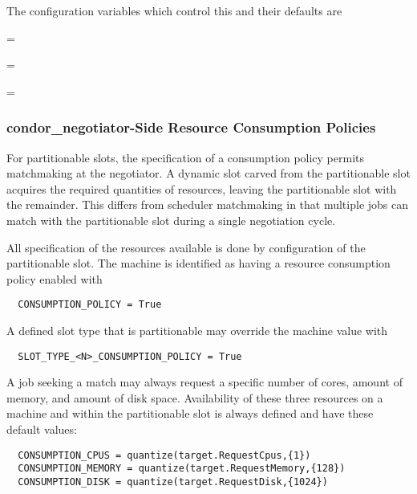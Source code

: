 The  configuration variables which control this 
and their defaults are

\begin{description}
  \item{ = }
  \item{ = }
  \item{ = }
\end{description}

\subsubsection{\label{sec:consumption-policy}
condor\_negotiator-Side Resource Consumption Policies}
For partitionable slots, 
the specification of a consumption policy permits matchmaking
at the negotiator.
A dynamic slot carved from the partitionable slot acquires the
required quantities of resources, leaving the partitionable
slot with the remainder. 
This differs from scheduler matchmaking in that multiple
jobs can match with the partitionable slot during a single
negotiation cycle.

All specification of the resources available is done by configuration 
of the partitionable slot.  The machine is identified
as having a resource consumption policy enabled with
\begin{verbatim}
  CONSUMPTION_POLICY = True
\end{verbatim}
A defined slot type that is partitionable may override the
machine value with
\begin{verbatim}
  SLOT_TYPE_<N>_CONSUMPTION_POLICY = True
\end{verbatim}

A job seeking a match may always request a specific number of cores,
amount of memory, and amount of disk space.
Availability of these three resources on a machine and
within the partitionable slot
is always defined and have these default values:
\begin{verbatim}
  CONSUMPTION_CPUS = quantize(target.RequestCpus,{1})
  CONSUMPTION_MEMORY = quantize(target.RequestMemory,{128})
  CONSUMPTION_DISK = quantize(target.RequestDisk,{1024})
\end{verbatim}

